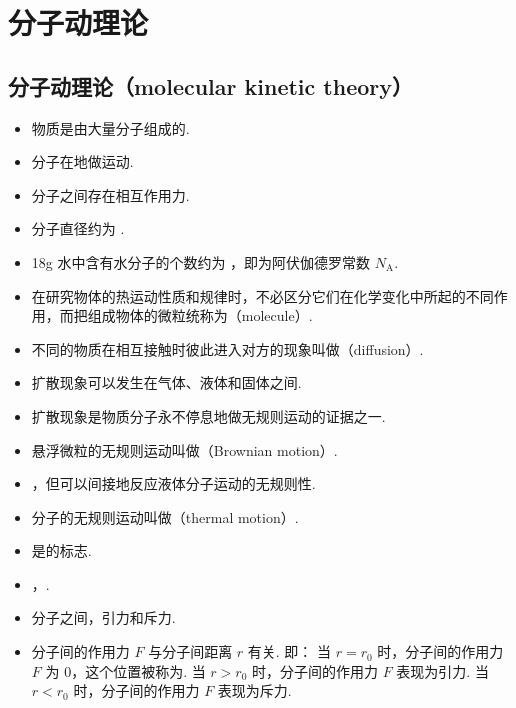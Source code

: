 \newpage
\section{分子动理论}

\subsection{分子动理论（molecular kinetic theory）}
\vspace{10pt}
\begin{itemize}
\item 物质是由大量分子组成的.
\item 分子在地做运动.
\item 分子之间存在相互作用力.
\item 分子直径约为 .
\item 18g 水中含有水分子的个数约为 ，即为阿伏伽德罗常数 $N_{\text{A}}$.
\item 在研究物体的热运动性质和规律时，不必区分它们在化学变化中所起的不同作用，而把组成物体的微粒统称为（molecule）.
\item 不同的物质在相互接触时彼此进入对方的现象叫做（diffusion）.
\item 扩散现象可以发生在气体、液体和固体之间.
\item 扩散现象是物质分子永不停息地做无规则运动的证据之一.
\item 悬浮微粒的无规则运动叫做（Brownian motion）.
\item {}，但可以间接地反应液体分子运动的无规则性.
\item 分子的无规则运动叫做（thermal motion）. 
\item {}是的标志.
\item {}，.
\item 分子之间，引力和斥力.
\item 分子间的作用力 $F$ 与分子间距离 $r$ 有关. 即：
\newline 当 $r=r_0$ 时，分子间的作用力 $F$ 为 0，这个位置被称为.
\newline 当 $r>r_0$ 时，分子间的作用力 $F$ 表现为引力.
\newline 当 $r<r_0$ 时，分子间的作用力 $F$ 表现为斥力.
\begin{figure}[H]
	\centering
	\begin{tikzpicture}

\end{tikzpicture}
\end{figure}
\end{itemize}
